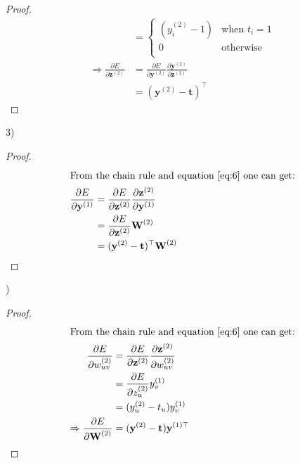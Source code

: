 \documentclass[letterpaper, 11pt]{article}
\begin{document}
\begin{proof}
\begin{align}
                                                      & =
        \begin{cases}
            (y_i^{(2)} -1) & \text{when $t_i=1$} \\
            0              & \text{otherwise}    \\
        \end{cases}                                                                                                                                  \\
        \Rightarrow
        \frac{\partial E}{\partial \textbf{z}^{(2)}}  & =
        \frac{\partial E}{\partial \textbf{y}^{(2)}}\frac{\partial \textbf{y}^{(2)}}{\partial \textbf{z}^{(2)}}\nonumber                                                      \\
                                                      & =(\textbf{y}^{(2)} - \textbf{t})^\top\label{eq:6}
    \end{align}
\end{proof}
3)
\begin{proof}
    \begin{align}
        \intertext{From the chain rule and equation \eqref{eq:6} one can get:}
        \frac{\partial E}{\partial \textbf{y}^{(1)}} & =
        \frac{\partial E}{\partial \textbf{z}^{(2)}} \frac{\partial \textbf{z}^{(2)}}{\partial \textbf{y}^{(1)}}\nonumber     \\
                                                     & =\frac{\partial E}{\partial \textbf{z}^{(2)}}\textbf{W}^{(2)}\nonumber \\
                                                     & =(\textbf{y}^{(2)} - \textbf{t})^\top\textbf{W}^{(2)}\label{eq:7}
    \end{align}
\end{proof}
)
\begin{proof}
    \begin{align*}
        \intertext{From the chain rule and equation \eqref{eq:6} one can get:}
        \frac{\partial E}{\partial w_{uv}^{(2)}}     & =
        \frac{\partial E}{\partial \textbf{z}^{(2)}} \frac{\partial \textbf{z}^{(2)}}{\partial w_{uv}^{(2)}} \\
                                                     & =\frac{\partial E}{\partial z_u^{(2)}}y_v^{(1)}       \\
                                                     & =(y_u^{(2)} - t_u)y_v^{(1)}                           \\
        \Rightarrow
        \frac{\partial E}{\partial \textbf{W}^{(2)}} & =(\textbf{y}^{(2)} - \textbf{t})\textbf{y}^{(1)\top}
    \end{align*}\end{proof}
\end{document}
